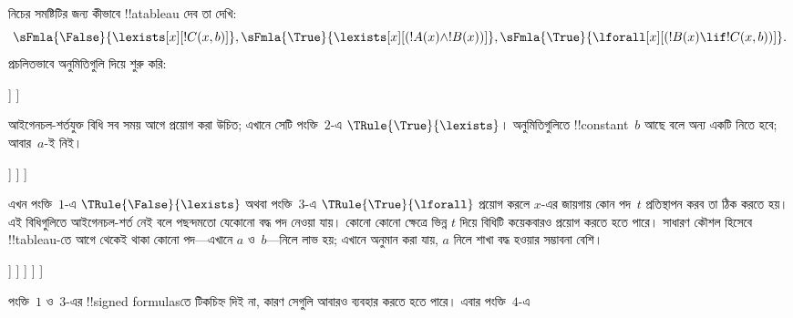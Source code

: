 \documentclass[../../../include/open-logic-section]{subfiles}
\begin{document}
\begin{ex}
নিচের সমষ্টিটির জন্য কীভাবে !!a{tableau} দেব তা দেখি:
\[
\sFmla{\False}{\lexists[x][!C(x,b)]},
\sFmla{\True}{\lexists[x][(!A(x) \land !B(x))]},
\sFmla{\True}{\lforall[x][(!B(x) \lif !C(x,b))]}.
\]
প্রচলিতভাবে অনুমিতিগুলি দিয়ে শুরু করি:
\begin{oltableau}
  [\sFmla{\False}{\lexists[x][\formula{C}(x,b)]}, just=\TAss
    [\sFmla{\True}{\lexists[x][(\formula{A}(x) \land \formula{B}(x))]},
      just=\TAss
      [\sFmla{\True}{\lforall[x][(\formula{B}(x) \lif \formula{C}(x,b))]},
        just=\TAss]
    ]
  ]
\end{oltableau}
আইগেনচল-শর্তযুক্ত বিধি সব সময় আগে প্রয়োগ করা উচিত; এখানে সেটি
পংক্তি~$2$-এ $\TRule{\True}{\lexists}$। অনুমিতিগুলিতে
!!{constant}~$b$ আছে বলে অন্য একটি নিতে হবে; আবার~$a$-ই নিই।
\begin{oltableau}
  [\sFmla{\False}{\lexists[x][\formula{C}(x,b)]}, just=\TAss
    [\sFmla{\True}{\lexists[x][(\formula{A}(x) \land \formula{B}(x))]},
      just=\TAss, checked
      [\sFmla{\True}{\lforall[x][(\formula{B}(x) \lif \formula{C}(x,b))]},
        just=\TAss
        [\sFmla{\True}{\formula{A}(a) \land \formula{B}(a)},
          just={\TRule{\True}{\lexists}[2]}]
      ]
    ]
  ]
\end{oltableau}
এখন পংক্তি~$1$-এ $\TRule{\False}{\lexists}$ অথবা পংক্তি~$3$-এ
$\TRule{\True}{\lforall}$ প্রয়োগ করলে $x$-এর জায়গায় কোন পদ~$t$
প্রতিস্থাপন করব তা ঠিক করতে হয়। এই বিধিগুলিতে আইগেনচল-শর্ত নেই বলে
পছন্দমতো যেকোনো বদ্ধ পদ নেওয়া যায়। কোনো কোনো ক্ষেত্রে ভিন্ন
$t$ দিয়ে বিধিটি কয়েকবারও প্রয়োগ করতে হতে পারে। সাধারণ কৌশল
হিসেবে !!{tableau}-তে আগে থেকেই থাকা কোনো পদ—এখানে $a$ ও~$b$—নিলে
লাভ হয়; এখানে অনুমান করা যায়, $a$ নিলে শাখা বদ্ধ হওয়ার সম্ভাবনা
বেশি।
\begin{oltableau}
  [\sFmla{\False}{\lexists[x][\formula{C}(x,b)]}, just=\TAss
    [\sFmla{\True}{\lexists[x][(\formula{A}(x) \land \formula{B}(x))]},
      just=\TAss, checked
      [\sFmla{\True}{\lforall[x][(\formula{B}(x) \lif \formula{C}(x,b))]}, just=\TAss
        [\sFmla{\True}{\formula{A}(a) \land \formula{B}(a)}, just={\TRule{\True}{\lexists}[2]}
          [\sFmla{\False}{\formula{C}(a,b)}, just={\TRule{\False}{\lexists}[1]}
            [\sFmla{\True}{\formula{B}(a) \lif \formula{C}(a,b)},
              just={\TRule{\True}{\lforall}[3]}
            ]
          ]
        ]
      ]
    ]
  ]
\end{oltableau}
পংক্তি~$1$ ও~$3$-এর !!{signed formula}sতে টিকচিহ্ন দিই না, কারণ
সেগুলি আবারও ব্যবহার করতে হতে পারে। এবার পংক্তি~$4$-এ

\end{ex}
\end{document}
